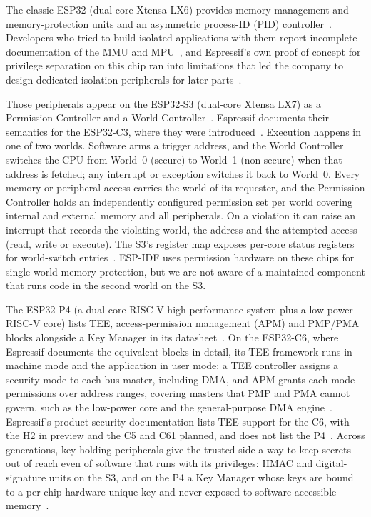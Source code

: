 \documentclass[conference,10pt]{IEEEtran}
\begin{document}
The classic ESP32 (dual-core Xtensa LX6) provides memory-management and memory-protection units and an asymmetric process-ID (PID) controller~\cite{esp32trm}. Developers who tried to build isolated applications with them report incomplete documentation of the MMU and MPU~\cite{espforummmu}, and Espressif's own proof of concept for privilege separation on this chip ran into limitations that led the company to design dedicated isolation peripherals for later parts~\cite{parekhprivsep}.

Those peripherals appear on the ESP32-S3 (dual-core Xtensa LX7) as a Permission Controller and a World Controller~\cite{esp32s3datasheet}. Espressif documents their semantics for the ESP32-C3, where they were introduced~\cite{espprivsepwcl}. Execution happens in one of two worlds. Software arms a trigger address, and the World Controller switches the CPU from World~0 (secure) to World~1 (non-secure) when that address is fetched; any interrupt or exception switches it back to World~0. Every memory or peripheral access carries the world of its requester, and the Permission Controller holds an independently configured permission set per world covering internal and external memory and all peripherals. On a violation it can raise an interrupt that records the violating world, the address and the attempted access (read, write or execute). The S3's register map exposes per-core status registers for world-switch entries~\cite{esp32s3pac}. ESP-IDF uses permission hardware on these chips for single-world memory protection, but we are not aware of a maintained component that runs code in the second world on the S3.

The ESP32-P4 (a dual-core RISC-V high-performance system plus a low-power RISC-V core) lists TEE, access-permission management (APM) and PMP/PMA blocks alongside a Key Manager in its datasheet~\cite{esp32p4datasheet}. On the ESP32-C6, where Espressif documents the equivalent blocks in detail, its TEE framework runs in machine mode and the application in user mode; a TEE controller assigns a security mode to each bus master, including DMA, and APM grants each mode permissions over address ranges, covering masters that PMP and PMA cannot govern, such as the low-power core and the general-purpose DMA engine~\cite{esptee}. Espressif's product-security documentation lists TEE support for the C6, with the H2 in preview and the C5 and C61 planned, and does not list the P4~\cite{espsecframeworks}. Across generations, key-holding peripherals give the trusted side a way to keep secrets out of reach even of software that runs with its privileges: HMAC and digital-signature units on the S3, and on the P4 a Key Manager whose keys are bound to a per-chip hardware unique key and never exposed to software-accessible memory~\cite{esp32p4security}.
\end{document}
